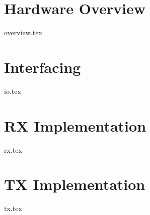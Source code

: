 \documentclass{book}
\begin{document}
\chapter{Hardware Overview}
{overview.tex}
\chapter{Interfacing}
{io.tex}


\chapter{RX Implementation}
{rx.tex}

\chapter{TX Implementation}
{tx.tex}
\end{document}
